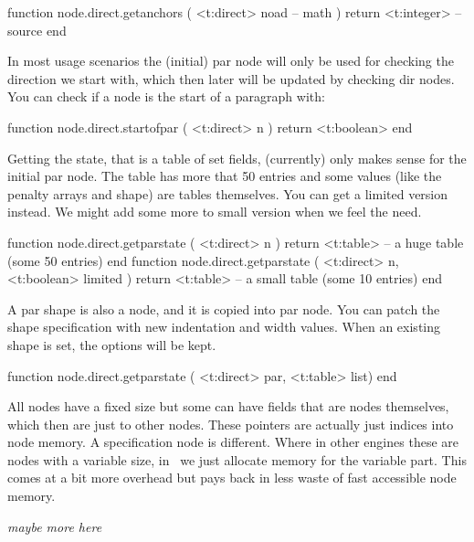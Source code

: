 function node.direct.getanchors (
    <t:direct> noad -- math
)
    return
        <t:integer> -- source
end
\stoptyping

\stopsubsection

\startsubsection[title={Paragraphs}]

In most usage scenarios the (initial) par node will only be used for checking the
direction we start with, which then later will be updated by checking dir nodes. You can
check if a node is the start of a paragraph with:

\starttyping[option=LUA]
function node.direct.startofpar ( <t:direct> n ) return <t:boolean> end
\stoptyping

Getting the state, that is a table of set fields, (currently) only makes sense
for the initial par node. The table has more that 50 entries and some values
(like the penalty arrays and shape) are tables themselves. You can get a limited
version instead. We might add some more to small version when we feel the need.

\starttyping[option=LUA]
function node.direct.getparstate (
    <t:direct> n
)
    return <t:table> -- a huge table (some 50 entries)
end
function node.direct.getparstate (
    <t:direct>  n,
    <t:boolean> limited
)
    return <t:table> -- a small table (some 10 entries)
end
\stoptyping

A par shape is also a node, and it is copied into par node. You can patch the
shape specification with new indentation and width values. When an existing shape
is set, the options will be kept.

\starttyping[option=LUA]
function node.direct.getparstate ( <t:direct> par, <t:table> list) end
\stoptyping

\stopsubsection

\startsubsection[title={Specifications}]

All nodes have a fixed size but some can have fields that are nodes themselves,
which then are just  to other nodes. These pointers are actually
just indices into node memory. A specification node is different. Where in other
engines these are nodes with a variable size, in \LUAMETATEX\ we just allocate
memory for the variable part. This comes at a bit more overhead but pays back in
less waste of fast accessible node memory.

{\em maybe more here}

\stopsubsection

\startsubsection[title={Math}]

